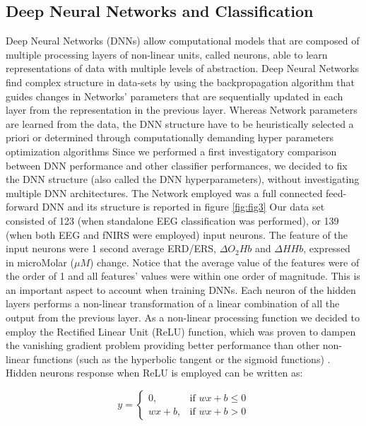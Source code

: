 \documentclass[12pt ]{iopart}
\begin{document}
\subsection{Deep Neural Networks and Classification}
Deep Neural Networks (DNNs) allow computational models that are composed of multiple  processing layers of non-linear units, called neurons, able to learn representations of data with multiple levels of abstraction.
Deep Neural Networks find complex structure in  data-sets by using the backpropagation algorithm \parencite{hecht1988theory} that guides changes in Networks' parameters that are sequentially updated in each layer from the representation in the previous layer.
Whereas Network parameters are learned from the data, the DNN structure have to be heuristically selected a priori or determined through computationally demanding hyper parameters optimization algorithms %
\parencite{mackay1996hyperparameters,snoek2012practical,bengio2000gradient}
Since we performed a first investigatory comparison between DNN performance and other classifier performances, we decided to fix the DNN structure (also called the DNN hyperparameters), without investigating multiple DNN architectures.
The Network employed was a full connected feed-forward DNN and its structure is reported in figure \ref{fig:fig3}
Our data set consisted of 123 (when standalone EEG classification was performed), or 139 (when both EEG and fNIRS were employed) input neurons. 
The feature of the input neurons were 1 second average ERD/ERS, $\Delta O_{2}Hb$ and $\Delta HHb$, expressed in microMolar ($\mu M$) change. Notice that the average value of the features were of the order of 1 and all features' values were within one order of magnitude. This is an important aspect to account when training DNNs.
Each neuron of the hidden layers performs a non-linear transformation of a linear combination of all the output from the previous layer. As a non-linear processing function we decided to employ the Rectified Linear Unit (ReLU) function, which was proven to dampen the vanishing gradient problem providing better performance than other non-linear functions (such as the hyperbolic tangent or the sigmoid functions) \parencite{dahl2013improving}. Hidden neurons response  when ReLU is employed can be written as:

\begin{equation}
y=
\begin{cases}
0,& \text{if } wx+b \leq 0\\
wx+b,&\text{if } wx+b > 0
\end{cases}
\end{equation}
\end{document}
